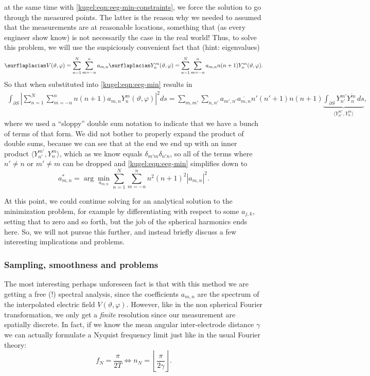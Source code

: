 at the same time with \eqref{kugel:eqn:eeg-min-constraints}, we force the
solution to go through the measured points. The latter is the reason why we
needed to assumed that the measurements are at reasonable locations, something
that (as every engineer show know) is not necessarily the case in the real
world! Thus, to solve this problem, we will use the suspiciously convenient fact
that (hint: eigenvalues)
\begin{equation*}
  \surflaplacian V(\vartheta, \varphi)
    = \sum_{n=1}^N \sum_{m=-n}^n a_{m,n}
      \surflaplacian Y^m_n(\vartheta, \varphi)
    = \sum_{n=1}^N \sum_{m=-n}^n a_{m,n}
      n(n+1) Y^m_n(\vartheta, \varphi).
\end{equation*}
So that when substituted into \eqref{kugel:eqn:eeg-min} results in
\begin{align*}
  \int_{\partial S} \left|
    \sum_{n=1}^N \sum_{m=-n}^n n(n+1) a_{m,n}
    Y^m_n(\vartheta, \varphi)
  \right|^2 ds
  = \sum_{m, m'} \sum_{n, n'} a_{m',n'} \overline{a_{m,n}}
    n'(n'+1) n(n+1)
    \underbrace{\int_{\partial S} Y^{m'}_{n'} \overline{Y^m_n} \, ds}_{
      \langle Y^{m'}_{n'}, Y^m_n \rangle
    },
\end{align*}
where we used a ``sloppy'' double sum notation to indicate that we have a bunch
of terms of that form. We did not bother to properly expand the product of
double sums, because we can see that at the end we end up with an inner product
$\langle Y^{m'}_{n'}, Y^m_n \rangle$, which as we know equals $\delta_{m'm}
\delta_{n'n}$, so all of the terms where $n' \neq n$ or $m' \neq m$ can be
dropped and \eqref{kugel:eqn:eeg-min} simplifies down to
\nocite{pascual-marqui_current_1988}
\begin{equation}
  a^*_{m,n} = \arg \min_{a_{m,n}} 
    \sum_{n=1}^N \sum_{m=-n}^n n^2 (n+1)^2 |a_{m,n}|^2.
\end{equation}

At this point, we could continue solving for an analytical solution to the
minimization problem, for example by differentiating with respect to some
$a_{j,k}$, setting that to zero and so forth, but the job of the spherical
harmonics ends here. So, we will not pursue this further, and instead briefly
discuss a few interesting implications and problems. 

\subsubsection{Sampling, smoothness and problems}

The most interesting perhaps unforeseen fact is that with this method we are
getting a free (!) spectral analysis, since the coefficients $a_{m,n}$ are the
spectrum of the interpolated electric field $V(\vartheta, \varphi)$. However,
like in the non spherical Fourier transformation, we only get a \emph{finite}
resolution since our measurement are spatially discrete. In fact, if we know the
mean angular inter-electrode distance $\gamma$ we can actually formulate a
Nyquist frequency limit just like in the usual Fourier theory:
\begin{equation*}
  f_N = \frac{\pi}{2T}
  \iff
  n_N = \left\lfloor \frac{\pi}{2\gamma} \right\rfloor.
\end{equation*}

